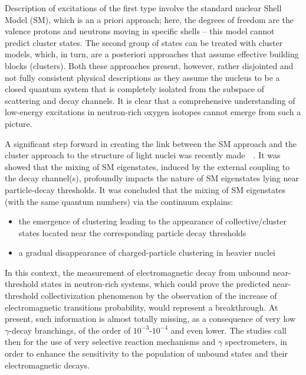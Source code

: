 Description of excitations of the first type involve the standard nuclear
Shell Model (SM), which is an a priori approach; here, the degrees of freedom
are the valence protons and neutrons moving in specific shells – this model
cannot predict cluster states.
The second group of states can be treated with cluster models, which, in turn,
are a posteriori approaches that assume effective building blocks (clusters).
Both these approaches present, however, rather disjointed and not fully
consistent physical descriptions as they assume the nucleus to be a closed
quantum system that is completely isolated from the subspace of scattering and
decay channels. It is clear that a comprehensive understanding of low-energy
excitations in neutron-rich oxygen isotopes cannot emerge from such a picture.

\bigbreak

A significant step forward in creating the link between the SM approach and
the cluster approach to the structure of light nuclei was recently
made~\cite{oko:cluster}~\cite{oko:origin}.
It was showed that the mixing of SM eigenstates, induced by the external
coupling to the decay channel(s), profoundly impacts the nature of SM
eigenstates lying near particle-decay thresholds. 
It was concluded that the mixing of SM eigenstates (with the same quantum
numbers) via the continuum explains:

\begin{itemize}
\item the emergence of clustering leading to the appearance of
collective/cluster states located near the corresponding particle decay
thresholds
\item a gradual disappearance of charged-particle clustering in heavier nuclei
\end{itemize}

\bigbreak

In this context, the measurement of electromagnetic decay from unbound
near-threshold states in neutron-rich systems, which could prove the predicted
near-threshold collectivization phenomenon by the observation of the increase
of electromagnetic transitions probability, would represent a breakthrough.
At present, such information is almost totally missing, as a consequence of
very low  $\gamma$-decay branchings, of the order of $10^{-3}$-$10^{-4}$ and
even lower. The studies call then for the use of very selective reaction
mechanisms and $\gamma$ spectrometers, in order to enhance the sensitivity to
the population of unbound states and their electromagnetic decays.



